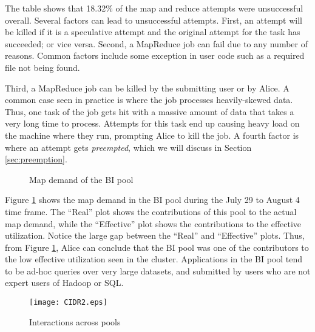 The table shows that 18.32\% of the 
map and reduce attempts were unsuccessful overall. 
Several factors can lead to unsuccessful attempts. First, 
an attempt will be killed if it is a speculative attempt and the
original attempt for the task has succeeded; or vice versa. Second, 
a MapReduce job can fail due to any number of reasons. Common 
factors include some exception in user code such as a required
file not being found. 

Third, a MapReduce job can be killed by 
the submitting user or by Alice.
A common case seen in practice
is where the job processes heavily-skewed data. Thus, one task
of the job gets hit with a massive amount of data that takes
a very long time to process. Attempts for this task end up causing 
heavy load on the machine where they run, prompting Alice 
to kill the job. A fourth factor is where an attempt gets {\em preempted},
which we will discuss in Section \ref{sec:preemption}. 

\begin{figure}
  \centering
  \caption{Map demand of the BI pool}
  \label{fig:BI-demand}
\end{figure}

Figure \ref{fig:BI-demand} shows the map demand in the BI 
pool during the July 29 to August 4 time frame. The ``Real''
plot shows the contributions of this pool 
to the actual map demand, while the ``Effective'' plot
shows the contributions to the effective utilization.
Notice the large gap between the ``Real'' and ``Effective'' plots.
Thus, from Figure \ref{fig:BI-demand}, Alice can conclude that 
the BI pool was one of the contributors to the low effective
utilization seen in the cluster. Applications in the BI pool 
tend to be ad-hoc queries over very large datasets, and 
submitted by users who are not expert users of Hadoop or SQL. 


\begin{figure}[t!]
        \centering
        \texttt{[image: CIDR2.eps]}
        \vspace{-4mm}
        \caption{Interactions across pools}
        \label{fig:analyst-Vs-modeling}
        \vspace{-6mm}
\end{figure}

